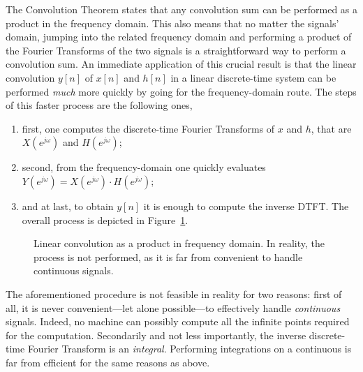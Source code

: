 \documentclass[\documentfontsize, twocolumn]{\classname}
\begin{document}
The Convolution Theorem states that any convolution sum can be performed as a product in the frequency domain. This also means that no matter the signals' domain, jumping into the related frequency domain and performing a product of the Fourier Transforms of the two signals is a straightforward way to perform a convolution sum.
An immediate application of this crucial result is that the linear convolution $y[n]$ of $x[n]$ and $h[n]$ in a linear discrete-time system can be performed \emph{much} more quickly by going for the frequency-domain route. The steps of this faster process are the following ones,
\begin{enumerate}
    \item first, one computes the discrete-time Fourier Transforms of $x$ and $h$, that are $X(e^{j\omega})$ and $H(e^{j\omega})$;
    \item second, from the frequency-domain one quickly evaluates $Y(e^{j\omega}) = X(e^{j\omega})\cdot H(e^{j\omega})$;
    \item and at last, to obtain $y[n]$ it is enough to compute the inverse DTFT. The overall process is depicted in Figure~\ref{tikz:linearConvolutionFrequencyDomain}.
\end{enumerate}
\begin{figure}[ht]
\begin{center}
    \caption{Linear convolution as a product in frequency domain. In reality, the process is not performed, as it is far from convenient to handle continuous signals.}\label{tikz:linearConvolutionFrequencyDomain}
\end{center}
\end{figure}

The aforementioned procedure is not feasible in reality for two reasons: first of all, it is never convenient---let alone possible---to effectively handle \emph{continuous} signals. Indeed, no machine can possibly compute all the infinite points required for the computation. Secondarily and not less importantly, the inverse discrete-time Fourier Transform is an \emph{integral}. Performing integrations on a continuous is far from efficient for the same reasons as above.
\end{document}
